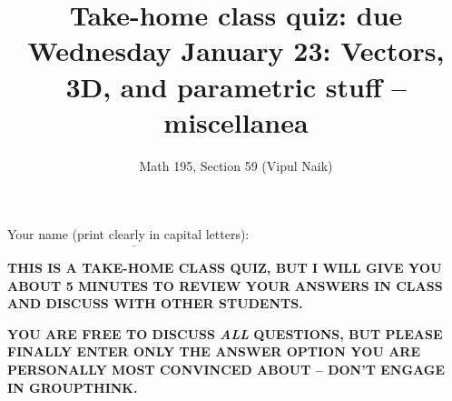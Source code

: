 \documentclass[10pt]{amsart}
\title{Take-home class quiz: due Wednesday January 23: Vectors, 3D, and parametric stuff -- miscellanea}
\author{Math 195, Section 59 (Vipul Naik)}
\begin{document}
\maketitle

Your name (print clearly in capital letters): $\underline{\qquad\qquad\qquad\qquad\qquad\qquad\qquad\qquad\qquad\qquad}$

\vspace{0.1in}

{\bf THIS IS A TAKE-HOME CLASS QUIZ, BUT I WILL GIVE YOU ABOUT 5
  MINUTES TO REVIEW YOUR ANSWERS IN CLASS AND DISCUSS WITH OTHER
  STUDENTS.}

\vspace{0.1in}

{\bf YOU ARE FREE TO DISCUSS {\em ALL} QUESTIONS, BUT PLEASE FINALLY
  ENTER ONLY THE ANSWER OPTION YOU ARE PERSONALLY MOST CONVINCED ABOUT
  -- DON'T ENGAGE IN GROUPTHINK.}
\end{document}
